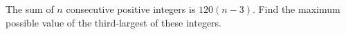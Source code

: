The sum of $n$ consecutive positive integers is $120(n-3)$. Find the maximum possible value of the third-largest of these integers.
